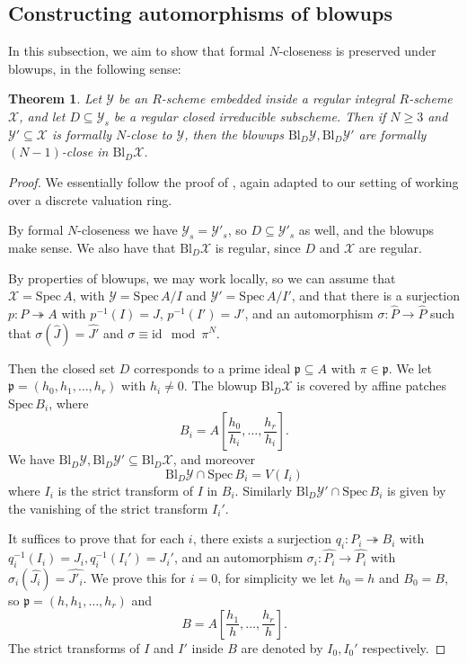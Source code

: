 \documentclass{article}
\theoremstyle{definition}
\theoremstyle{plain}
\newtheorem{thm}[defn]{Theorem}
\theoremstyle{remark}
\newcommand{\spec}{\mathrm{Spec}\,}
\newcommand{\bl}{\mathrm{Bl}}
\newcommand{\onto}{\twoheadrightarrow}
\newcommand{\id}{\mathrm{id}}
\newcommand{\comp}[1]{\widehat{#1}}
\begin{document}
	\subsection{Constructing automorphisms of blowups}
	In this subsection, we aim to show that formal $N$-closeness is preserved under blowups, in the following sense:
	\begin{thm}\label{blowup_formal_closeness}
		Let $\mathcal{Y}$ be an $R$-scheme embedded inside a regular integral $R$-scheme $\mathcal{X}$, and let $D\subseteq \mathcal{Y}_s$ be a regular closed irreducible subscheme. Then if $N\ge 3$ and $\mathcal{Y}'\subseteq \mathcal{X}$ is formally $N$-close to $\mathcal{Y}$, then the blowups $\bl_D \mathcal{Y}, \bl_D \mathcal{Y}'$ are formally $(N-1)$-close in $\bl_D \mathcal{X}$.
	\end{thm}
	\begin{proof}
		We essentially follow the proof of \cite[Theorem 5.1]{Cutkosky_Srinivasan_1993}, again adapted to our setting of working over a discrete valuation ring.
		
		By formal $N$-closeness we have $\mathcal{Y}_s = \mathcal{Y}'_s$, so $D\subseteq \mathcal{Y}'_s$ as well, and the blowups make sense. We also have that $\bl_D \mathcal{X}$ is regular, since $D$ and $\mathcal{X}$ are regular.
		
		By properties of blowups, we may work locally, so we can assume that $\mathcal{X} = \spec A$, with $\mathcal{Y} = \spec A/I$ and $\mathcal{Y}' = \spec A/I'$, and that there is a surjection $p: P \onto A$ with $p^{-1}(I) = J$, $p^{-1}(I') = J'$, and an automorphism $\sigma: \comp{P}\to \comp{P}$ such that $\sigma(\comp{J}) = \comp{J'}$ and $\sigma \equiv \id \mod \pi^N$.
		
		Then the closed set $D$ corresponds to a prime ideal $\mathfrak{p}\subseteq A$ with $\pi\in \mathfrak{p}$. We let $\mathfrak{p} = (h_0, h_1, \ldots, h_r)$ with $h_i\not=0$. The blowup $\bl_D \mathcal{X}$ is covered by affine patches $\spec B_i$, where
		\[B_i = A\left[\frac{h_0}{h_i}, \ldots, \frac{h_r}{h_i}\right].\]
		We have $\bl_D\mathcal{Y},\bl_D\mathcal{Y}'\subseteq \bl_D\mathcal{X}$, and moreover
		\[\bl_D\mathcal{Y}\cap \spec B_i = V(I_i)\]
		where $I_i$ is the strict transform of $I$ in $B_i$.
		Similarly $\bl_D\mathcal{Y}'\cap \spec B_i$ is given by the vanishing of the strict transform $I_i'$.
		
		It suffices to prove that for each $i$, there exists a surjection $q_i:P_i\onto B_i$ with $q_i^{-1}(I_i) = J_i, q_i^{-1}(I_i') = J_i'$, and an automorphism $\sigma_i: \comp{P_i}\to \comp{P_i}$ with $\sigma_i(\comp{J_i}) = \comp{J'_i}$. We prove this for $i=0$, for simplicity we let $h_0 = h$ and $B_0 = B$, so $\mathfrak{p} = (h, h_1, \ldots, h_r)$ and
		\[B =A\left[\frac{h_1}{h}, \ldots, \frac{h_r}{h}\right].\] 
		The strict transforms of $I$ and $I'$ inside $B$ are denoted by $I_0, I_0'$ respectively.
		

\end{proof}
\end{document}
